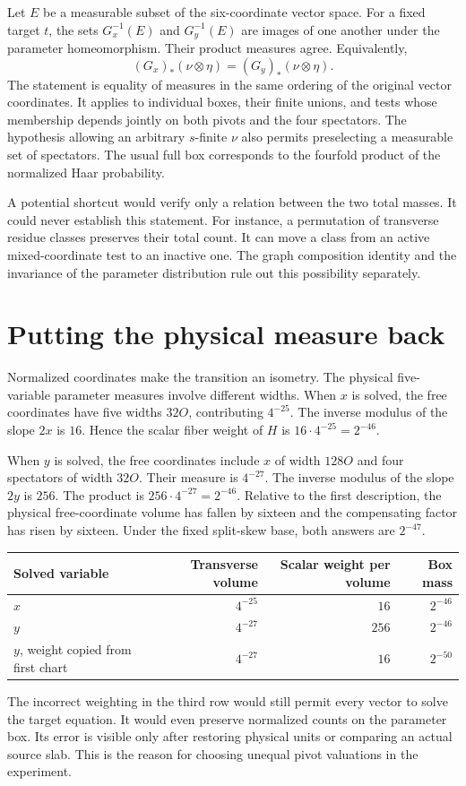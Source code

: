 \documentclass[12pt,letterpaper]{article}
\begin{document}
Let $E$ be a measurable subset of the six-coordinate vector space. For a fixed target $t$, the sets $G_x^{-1}(E)$ and $G_y^{-1}(E)$ are images of one another under the parameter homeomorphism. Their product measures agree. Equivalently,
\[
          (G_x)_*(\nu\otimes\eta)=(G_y)_*(\nu\otimes\eta).
\]
The statement is equality of measures in the same ordering of the original vector coordinates. It applies to individual boxes, their finite unions, and tests whose membership depends jointly on both pivots and the four spectators. The hypothesis allowing an arbitrary $s$-finite $\nu$ also permits preselecting a measurable set of spectators. The usual full box corresponds to the fourfold product of the normalized Haar probability.

A potential shortcut would verify only a relation between the two total masses. It could never establish this statement. For instance, a permutation of transverse residue classes preserves their total count. It can move a class from an active mixed-coordinate test to an inactive one. The graph composition identity and the invariance of the parameter distribution rule out this possibility separately.

\section{Putting the physical measure back}
Normalized coordinates make the transition an isometry. The physical five-variable parameter measures involve different widths. When $x$ is solved, the free coordinates have five widths $32O$, contributing $4^{-25}$. The inverse modulus of the slope $2x$ is $16$. Hence the scalar fiber weight of $H$ is $16\cdot4^{-25}=2^{-46}$.

When $y$ is solved, the free coordinates include $x$ of width $128O$ and four spectators of width $32O$. Their measure is $4^{-27}$. The inverse modulus of the slope $2y$ is $256$. The product is $256\cdot4^{-27}=2^{-46}$. Relative to the first description, the physical free-coordinate volume has fallen by sixteen and the compensating factor has risen by sixteen. Under the fixed split-skew base, both answers are $2^{-47}$.

\begin{center}\small\begin{tabular}{@{}lrrr@{}}\toprule
Solved variable & Transverse volume & Scalar weight per volume & Box mass\\\midrule
$x$ & $4^{-25}$ & $16$ & $2^{-46}$\\
$y$ & $4^{-27}$ & $256$ & $2^{-46}$\\
$y$, weight copied from first chart & $4^{-27}$ & $16$ & $2^{-50}$\\\bottomrule
\end{tabular}\end{center}
The incorrect weighting in the third row would still permit every vector to solve the target equation. It would even preserve normalized counts on the parameter box. Its error is visible only after restoring physical units or comparing an actual source slab. This is the reason for choosing unequal pivot valuations in the experiment.
\end{document}
